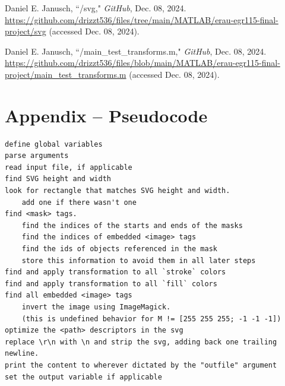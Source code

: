 \documentclass[12pt]{article}
\begin{document}
\vspace{-20px}
\begin{enumerate}[label={[7]}]
	\item Daniel E. Janusch, ``/svg," {\it GitHub}, Dec. 08, 2024.
	\url{https://github.com/drizzt536/files/tree/main/MATLAB/erau-egr115-final-project/svg}
	(accessed Dec. 08, 2024).
	\label{svg folder}
\end{enumerate}
\vspace{-20px}
\begin{enumerate}[label={[8]}]
	\item Daniel E. Janusch, ``/main\_test\_transforms.m," {\it GitHub}, Dec. 08, 2024.
	\url{https://github.com/drizzt536/files/blob/main/MATLAB/erau-egr115-final-project/main_test_transforms.m}
	(accessed Dec. 08, 2024).
	\label{tfm tests}
\end{enumerate}

\pagebreak
\section{Appendix {\bf–} Pseudocode}

\begin{verbatim}
define global variables
parse arguments
read input file, if applicable
find SVG height and width
look for rectangle that matches SVG height and width.
    add one if there wasn't one
find <mask> tags.
    find the indices of the starts and ends of the masks
    find the indices of embedded <image> tags
    find the ids of objects referenced in the mask
    store this information to avoid them in all later steps
find and apply transformation to all `stroke` colors
find and apply transformation to all `fill` colors
find all embedded <image> tags
    invert the image using ImageMagick.
    (this is undefined behavior for M != [255 255 255; -1 -1 -1])
optimize the <path> descriptors in the svg
replace \r\n with \n and strip the svg, adding back one trailing newline.
print the content to wherever dictated by the "outfile" argument
set the output variable if applicable
\end{verbatim}
\end{document}
